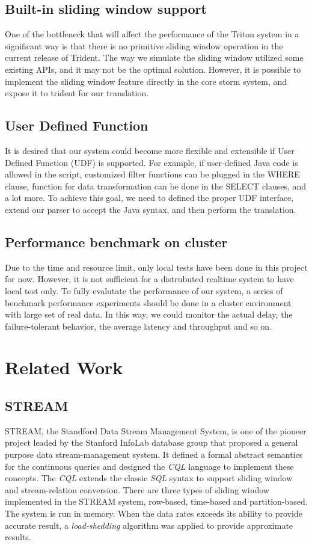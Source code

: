 \documentclass[conference, twocolumn, 11pt]{IEEEtran}
\theoremstyle{definition}
\begin{document}
\subsection{Built-in sliding window support}
One of the bottleneck that will affect the performance of the Triton system in a significant way is that there is no primitive sliding window operation in the current release of Trident.
The way we simulate the sliding window utilized some existing APIs, and it may not be the optimal solution. However, it is possible to implement the sliding window feature directly in
the core storm system, and expose it to trident for our translation.

\subsection{User Defined Function}
It is desired that our system could become more flexible and extensible if User Defined Function (UDF) is supported. For example, if user-defined Java code is allowed in the script,
customized filter functions can be plugged in the WHERE clause, function for data transformation can be done in the SELECT clauses, and a lot more.
To achieve this goal, we need to defined the proper UDF interface, extend our parser to accept the Java syntax, and then perform the translation.

\subsection{Performance benchmark on cluster}
Due to the time and resource limit, only local tests have been done in this project for now. However, it is not sufficient for a distrubuted realtime system to have local test only.
To fully evalutate the performance of our system, a series of benchmark performance experiments should be done in a cluster environment with large set of real data. In this way,
we could monitor the actual delay, the failure-tolerant behavior, the average latency and throughput and so on.


\section{Related Work}\label{rel-work}
\subsection{STREAM}
STREAM, the Standford Data Stream Management System, is one of the pioneer project leaded by the Stanford InfoLab database group that proposed a general purpose data stream-management system.
It defined a formal abstract semantics for the continuous queries and designed the \emph{CQL} language to implement these concepts. The \emph{CQL} extends the classic \emph{SQL} syntax to
support sliding window and stream-relation conversion. There are three types of sliding window implemented in the STREAM system, row-based, time-based and partition-based. The system is run in
memory. When the data rates exceeds its ability to provide accurate result, a \emph{load-shedding} algorithm was applied to provide approximate results.
\end{document}
